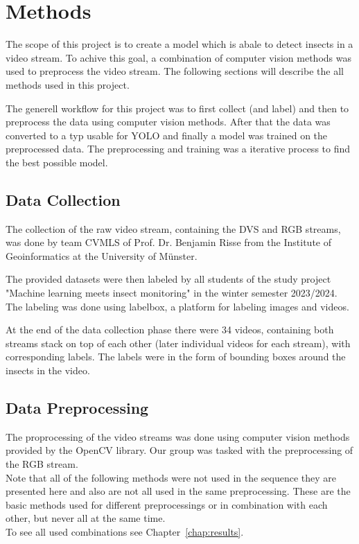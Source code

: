\chapter{Methods}
\label{ch:methods}



The scope of this project is to create a model which is abale to detect insects in a video stream. To achive this goal, a combination of computer vision methods was used to preprocess the video stream. The following sections will describe the all methods used in this project.

The generell workflow for this project was to first collect (and label) and then to preprocess the data using computer vision methods. After that the data was converted to a typ usable for YOLO and finally a model was trained on the preprocessed data. The preprocessing and training was a iterative process to find the best possible model.

\section{Data Collection}

The collection of the raw video stream, containing the DVS and RGB streams, was done by team CVMLS of Prof. Dr. Benjamin Risse from the Institute of Geoinformatics at the University of Münster.

The provided datasets were then labeled by all students of the study project "Machine learning meets insect monitoring" in the winter semester 2023/2024. The labeling was done using labelbox, a platform for labeling images and videos. 

At the end of the data collection phase there were 34 videos, containing both streams stack on top of each other (later individual videos for each stream), with corresponding labels. The labels were in the form of bounding boxes around the insects in the video.

\section{Data Preprocessing}

The proprocessing of the video streams was done using computer vision methods provided by the OpenCV library. Our group was tasked with the preprocessing of the RGB stream.\\
Note that all of the following methods were not used in the sequence they are presented here and also are not all used in the same preprocessing. These are the basic methods used for different preprocessings or in combination with each other, but never all at the same time.\\
To see all used combinations see Chapter~\ref{chap:results}.

